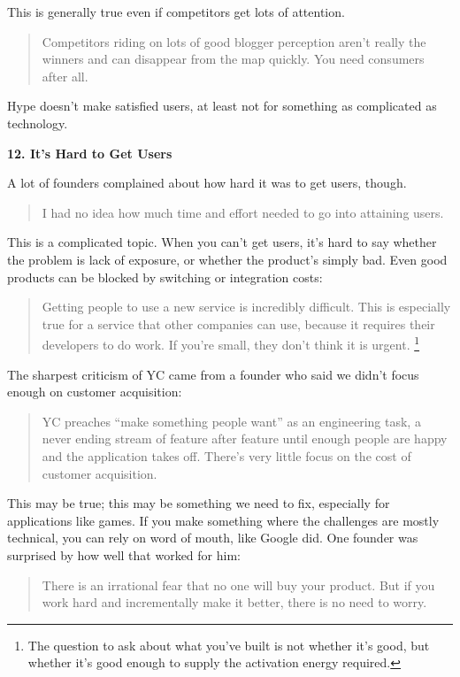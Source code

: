 \documentclass[12pt]{book}
\begin{document}
This is generally true even if competitors get lots of attention.

\begin{quote}
Competitors riding on lots of good blogger perception aren't really the
winners and can disappear from the map quickly. You need consumers after
all.
\end{quote}

Hype doesn't make satisfied users, at least not for something as
complicated as technology.

\textbf{12. It's Hard to Get Users}

A lot of founders complained about how hard it was to get users, though.

\begin{quote}
I had no idea how much time and effort needed to go into attaining
users.
\end{quote}

This is a complicated topic. When you can't get users, it's hard to say
whether the problem is lack of exposure, or whether the product's simply
bad. Even good products can be blocked by switching or integration
costs:

\begin{quote}
Getting people to use a new service is incredibly difficult. This is
especially true for a service that other companies can use, because it
requires their developers to do work. If you're small, they don't think
it is urgent. \footnote{The question to ask about what you've built is not whether it's
good, but whether it's good enough to supply the activation energy
required.}
\end{quote}

The sharpest criticism of YC came from a founder who said we didn't
focus enough on customer acquisition:

\begin{quote}
YC preaches ``make something people want'' as an engineering task, a
never ending stream of feature after feature until enough people are
happy and the application takes off. There's very little focus on the
cost of customer acquisition.
\end{quote}

This may be true; this may be something we need to fix, especially for
applications like games. If you make something where the challenges are
mostly technical, you can rely on word of mouth, like Google did. One
founder was surprised by how well that worked for him:

\begin{quote}
There is an irrational fear that no one will buy your product. But if
you work hard and incrementally make it better, there is no need to
worry.
\end{quote}
\end{document}
